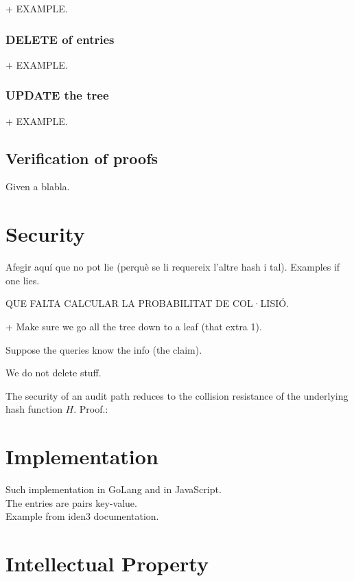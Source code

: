 \documentclass[11pt]{article}
\begin{document}
+ EXAMPLE.

\subsubsection{DELETE of entries}%
+ EXAMPLE.

\subsubsection{UPDATE the tree}%
+ EXAMPLE.

\subsection{Verification of proofs}
Given a blabla. 

\section{Security}					%


Afegir aquí que no pot lie (perquè se li requereix l'altre hash i tal). Examples if one lies.

QUE FALTA CALCULAR LA PROBABILITAT DE COL·LISIÓ.

+ Make sure we go all the tree down to a leaf (that extra 1).

Suppose the queries know the info (the claim).

We do not delete stuff.

The  security  of  an  audit  path  reduces  to  the  collision  resistance  of the underlying hash function $H$.
Proof.: %

\section{Implementation}			%
Such implementation in GoLang and in JavaScript. \\

The entries are pairs key-value.\\

Example from iden3 documentation.
	
\section {Intellectual Property}	

%
%
\end{document}
